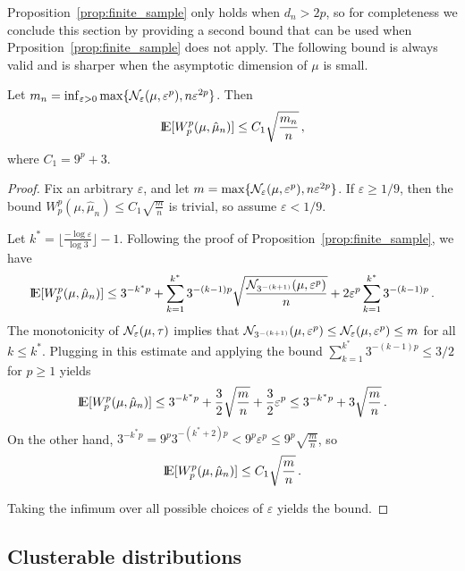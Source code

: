 \documentclass[sts]{imsart}
\newcommand*{\ep}{\varepsilon}
\begin{document}
Proposition~\ref{prop:finite_sample} only holds when $d_n > 2p$, so for completeness we conclude this section by providing a second bound that can be used when Prposition~\ref{prop:finite_sample} does not apply.
The following bound is always valid and is sharper when the asymptotic dimension of $\mu$ is small.

\begin{proposition}\label{prop:sqrt_n_bound}
Let $m_n = \inf_{\ep > 0}\max\{\cN_{\ep}(\mu, \ep^p), n \ep^{2p}\}$.
Then
\begin{equation*}
{\rm I}\kern-0.18em{\rm E}[W_p^p(\mu, \hat \mu_n)] \leq C_1 \sqrt{\frac{m_n}{n}}\,,
\end{equation*}
where $C_1 = 9^p+3$.
\end{proposition}
\begin{proof}
Fix an arbitrary $\ep$, and let $m = \max\{\cN_{\ep}(\mu, \ep^p), n \ep^{2p}\}$.
If $\ep \geq 1/9$, then the bound $W_p^p(\mu, \hat \mu_n) \leq C_1 \sqrt{\frac m n}$ is trivial, so assume $\ep < 1/9$.

Let $k^* = \Big\lfloor \frac{- \log \ep}{\log 3} \Big\rfloor - 1$.
Following the proof of Proposition~\ref{prop:finite_sample}, we have
\begin{equation*}
\E[W_p^p(\mu, \hat \mu_n)] \leq 3^{- k^* p} + \sum_{k=1}^{k^*}3^{-(k-1)p}\sqrt{\frac{\cN_{3^{-(k+1)}}(\mu, \ep^p)}{n}} + 2 \ep^p \sum_{k=1}^{k^*} 3^{-(k-1)p}\,.
\end{equation*}
The monotonicity of $\cN_\ep(\mu, \tau)$ implies that $\cN_{3^{-(k+1)}}(\mu, \ep^p) \leq \cN_{\ep}(\mu, \ep^p) \leq m$ for all $k \leq k^*$.
Plugging in this estimate and applying the bound $\sum_{k=1}^{k^*} 3^{-(k-1)p} \leq 3/2$ for $p \geq 1$ yields
\begin{equation*}
\E[W_p^p(\mu, \hat \mu_n)] \leq 3^{-k^* p} + \frac 3 2 \sqrt{\frac{m}{n}} + \frac 3 2 \ep^p \leq 3^{-k^* p} + 3 \sqrt{\frac m n}\,.
\end{equation*}
On the other hand, $3^{-k^*p} = 9^p 3^{-(k^*+2)p} < 9^p \ep^p \leq 9^p \sqrt{\frac{m}{n}}$, so
\begin{equation*}
{\rm I}\kern-0.18em{\rm E}[W_p^p(\mu, \hat \mu_n)] \leq C_1 \sqrt{\frac m n}\,.
\end{equation*}

Taking the infimum over all possible choices of $\ep$ yields the bound.
\end{proof}



\subsection{Clusterable distributions}
\end{document}

